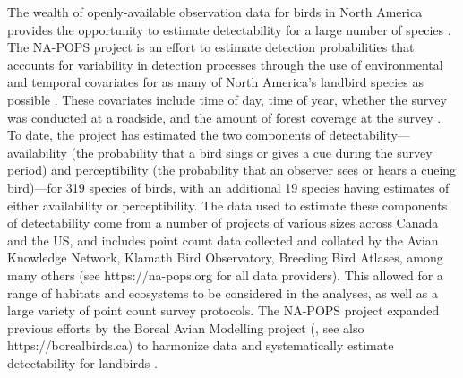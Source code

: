 \documentclass[12pt]{article}
\begin{document}
\par The wealth of openly-available observation data for birds in North America provides the opportunity to estimate detectability for a large number of species \citep{bennett_how_2024}. 
The NA-POPS project is an effort to estimate detection probabilities that accounts for variability in detection processes through the use of environmental and temporal covariates for as many of North America’s landbird species as possible \citep{edwards_point_2023}.
These covariates include time of day, time of year, whether the survey was conducted at a roadside, and the amount of forest coverage at the survey \citep{edwards_napops_2023}.
To date, the project has estimated the two components of detectability---availability (the probability that a bird sings or gives a cue during the survey period) and perceptibility (the probability that an observer sees or hears a cueing bird)---for 319 species of birds, with an additional 19 species having estimates of either availability or perceptibility. 
The data used to estimate these components of detectability come from a number of projects of various sizes across Canada and the US, and includes point count data collected and collated by the Avian Knowledge Network, Klamath Bird Observatory, Breeding Bird Atlases, among many others (see https://na-pops.org for all data providers).
This allowed for a range of habitats and ecosystems to be considered in the analyses, as well as a large variety of point count survey protocols.
The NA-POPS project expanded previous efforts by the Boreal Avian Modelling project (\citet{cumming_toward_2010}, see also https://borealbirds.ca) to harmonize data \citep{barker_ecological_2015} and systematically estimate detectability for landbirds \citep{solymos_calibrating_2013, solymos_evaluating_2018}.
\end{document}
